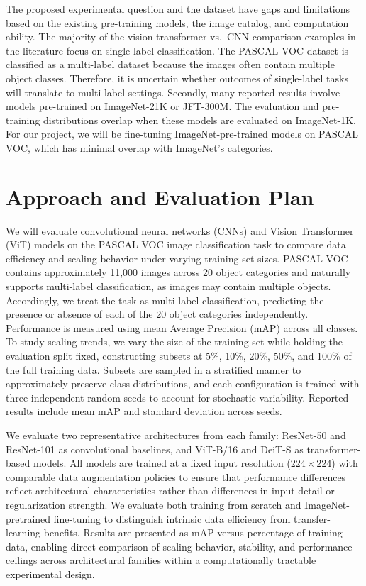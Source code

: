 \documentclass{article}
\begin{document}
The proposed experimental question and the dataset have gaps and limitations based on the existing pre-training models, the image catalog, and computation ability. The majority of the vision transformer vs.\ CNN comparison examples in the literature focus on single-label classification. The PASCAL VOC dataset is classified as a multi-label dataset because the images often contain multiple object classes. Therefore, it is uncertain whether outcomes of single-label tasks will translate to multi-label settings. Secondly, many reported results involve models pre-trained on ImageNet-21K or JFT-300M. The evaluation and pre-training distributions overlap when these models are evaluated on ImageNet-1K. For our project, we will be fine-tuning ImageNet-pre-trained models on PASCAL VOC, which has minimal overlap with ImageNet's categories.


\section{Approach and Evaluation Plan}

We will evaluate convolutional neural networks (CNNs) and Vision Transformer (ViT) models on the PASCAL VOC image classification task to compare data efficiency and scaling behavior under varying training-set sizes. PASCAL VOC contains approximately 11,000 images across 20 object categories and naturally supports multi-label classification, as images may contain multiple objects. Accordingly, we treat the task as multi-label classification, predicting the presence or absence of each of the 20 object categories independently. Performance is measured using mean Average Precision (mAP) across all classes. To study scaling trends, we vary the size of the training set while holding the evaluation split fixed, constructing subsets at 5\%, 10\%, 20\%, 50\%, and 100\% of the full training data. Subsets are sampled in a stratified manner to approximately preserve class distributions, and each configuration is trained with three independent random seeds to account for stochastic variability. Reported results include mean mAP and standard deviation across seeds.

We evaluate two representative architectures from each family: ResNet-50 and ResNet-101 as convolutional baselines, and ViT-B/16 and DeiT-S as transformer-based models. All models are trained at a fixed input resolution ($224 \times 224$) with comparable data augmentation policies to ensure that performance differences reflect architectural characteristics rather than differences in input detail or regularization strength. We evaluate both training from scratch and ImageNet-pretrained fine-tuning to distinguish intrinsic data efficiency from transfer-learning benefits. Results are presented as mAP versus percentage of training data, enabling direct comparison of scaling behavior, stability, and performance ceilings across architectural families within a computationally tractable experimental design.
\end{document}
